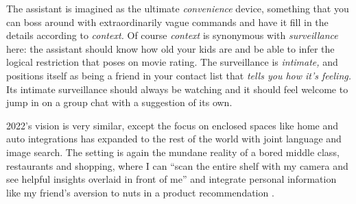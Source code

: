 The assistant is imagined as the ultimate \emph{convenience} device,
something that you can boss around with extraordinarily vague commands
and have it fill in the details according to \emph{context.} Of course
\emph{context} is synonymous with \emph{surveillance} here: the
assistant should know how old your kids are and be able to infer the
logical restriction that poses on movie rating. The surveillance is
\emph{intimate,} and positions itself as being a friend in your
contact list that \emph{tells you how it's feeling.} Its intimate
surveillance should always be watching and it should feel welcome to
jump in on a group chat with a suggestion of its own.

2022's vision is very similar, except the focus on enclosed spaces like
home and auto integrations has expanded to the rest of the world with
joint language and image search. The setting is again the mundane
reality of a bored middle class, restaurants and shopping, where I can
``scan the entire shelf with my camera and see helpful insights overlaid
in front of me'' and integrate personal
information like my friend's aversion to nuts in a product
recommendation \cite{googleGoogleKeynoteGoogle2022} .

